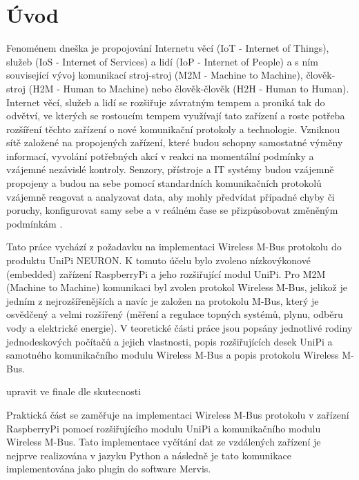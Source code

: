 \chapter*{Úvod}
{}

Fenoménem dneška je propojování Internetu věcí (IoT - Internet of Things), služeb (IoS - Internet of Services) a lidí (IoP - Internet of People) a s ním související vývoj komunikací stroj-stroj (M2M - Machine to Machine), člověk-stroj (H2M - Human to Machine) nebo člověk-člověk (H2H - Human to Human). Internet věcí, služeb a lidí se rozšiřuje závratným tempem a proniká tak do odvětví, ve kterých se rostoucím tempem využívají tato zařízení a roste potřeba rozšíření těchto zařízení o nové komunikační protokoly a technologie. Vzniknou sítě založené na propojených zařízení, které budou schopny samostatné výměny informací, vyvolání potřebných akcí v reakci na momentální podmínky a vzájemné nezávislé kontroly. Senzory, přístroje a IT systémy budou vzájemně propojeny a budou na sebe pomocí standardních komunikačních protokolů vzájemně reagovat a analyzovat data, aby mohly předvídat případné chyby či poruchy, konfigurovat samy sebe a v reálném čase se přizpůsobovat změněným podmínkám \cite{Prumysl4PDF,Prumysl4Web}.

Tato práce vychází z požadavku na implementaci Wireless M-Bus protokolu do produktu UniPi NEURON. K tomuto účelu bylo zvoleno nízkovýkonové (embedded) zařízení RaspberryPi a jeho rozšiřující modul UniPi. Pro M2M (Machine to Machine) komunikaci byl zvolen protokol Wireless M-Bus, jelikož je jedním z nejrozšířenějších a navíc je založen na protokolu M-Bus, který je osvědčený a velmi rozšířený (měření a regulace topných systémů, plynu, odběru vody a elektrické energie). V teoretické části práce jsou popsány jednotlivé rodiny jednodeskových počítačů a jejich vlastnosti, popis rozšiřujících desek UniPi a samotného komunikačního modulu Wireless M-Bus a popis protokolu Wireless M-Bus. 

\colorbox[rgb]{0,1,0}{upravit ve finale dle skutecnosti}

Praktická část se zaměřuje na implementaci Wireless M-Bus protokolu v zařízení RaspberryPi pomocí rozšiřujícího modulu UniPi a komunikačního modulu Wireless M-Bus. Tato implementace vyčítání dat ze vzdálených zařízení je nejprve realizována v jazyku Python a následně je tato komunikace implementována jako plugin do software Mervis.


 